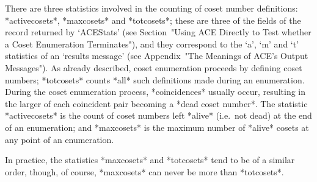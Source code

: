 
There are three statistics involved in the counting  of  coset  number
definitions:                       *activecosets*,
*maxcosets* and  *totcosets*;  these
are three of the fields of the  record  returned  by  `ACEStats'  (see
Section~"Using ACE  Directly  to  Test  whether  a  Coset  Enumeration
Terminates"), and they correspond to the `a', `m' and  `t'  statistics
of an {\ACE} \lq{}results  message'  (see  Appendix~"The  Meanings  of
ACE's Output  Messages").  As  already  described,  coset  enumeration
proceeds by defining coset  numbers;  *totcosets*  counts  *all*  such
definitions made during an enumeration. During the  coset  enumeration
process, *coincidences* usually occur, resulting in
the  larger  of  each  coincident  pair   becoming   a   *dead   coset
number*. The  statistic  *activecosets*  is
the count of coset  numbers  left  *alive*
(i.e.~not dead) at the end of an enumeration; and *maxcosets*  is  the
maximum number of *alive* cosets at any point of an enumeration.

In practice, the statistics *maxcosets* and *totcosets* tend to be  of
a similar order, though, of course, *maxcosets* can never be more than
*totcosets*.

